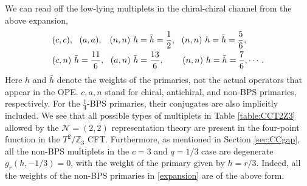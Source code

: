 \documentclass[12pt]{article}
\begin{document}
We can read off the low-lying multiplets in the chiral-chiral channel from the above expansion,
\begin{align}\label{expansion}
&(c,c),~~(a,a),~~\, (n,n)~h=\bar h= \frac12,~~(n,n)~h=\bar h= \frac56,\notag\\
&(c,n)~\bar h ={11\over6},~~
(a,n) ~ \bar h = {13\over 6},~~~\,~~~(n,n)~h=\bar h= \frac76, \cdots.
\end{align}
Here $h$ and $\bar h$ denote the weights of the primaries, not  the actual operators that appear in the OPE.  $c,a,n$ stand for chiral, antichiral, and non-BPS primaries, respectively. For the $\frac14$-BPS primaries, their conjugates are also implicitly included. We see that all possible types of multiplets in Table \ref{table:CCT2Z3} allowed by the $\mathcal{N}=(2,2)$ representation theory are present in the four-point function in the $T^2/\mathbb{Z}_3$ CFT.   Furthermore, as mentioned in Section \ref{sec:CCgap}, all the non-BPS multiplets in the $c=3$ and $q=1/3$ case are degenerate $g_r(h,-1/3)=0$, with the weight of the primary given by $h=r/3$.  Indeed, all the weights of the non-BPS primaries in \eqref{expansion} are of the above form.
\end{document}
